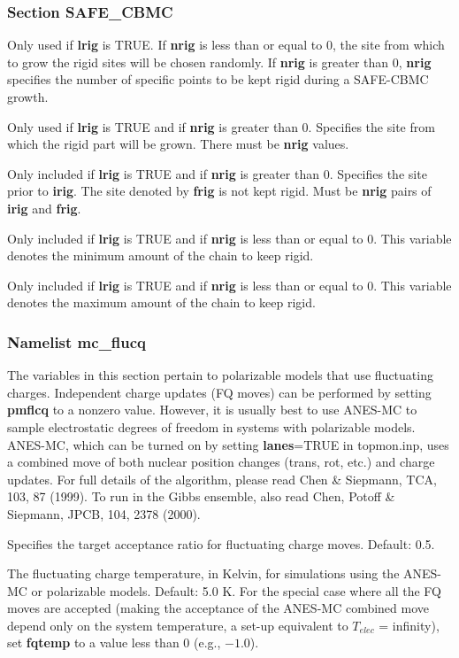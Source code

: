 \documentclass[12pt,letterpaper]{article}
\begin{document}
\subsubsection{Section \textbf{SAFE\_CBMC}}
 Only used if {\bf lrig} is TRUE. If
{\bf nrig} is less than or equal to 0, the site from which
to grow the rigid sites will be chosen randomly. If
{\bf nrig} is greater than 0, {\bf nrig} specifies the
number of specific points to be kept rigid during a
SAFE-CBMC growth.

 Only used if {\bf lrig} is TRUE and if
{\bf nrig} is greater than 0. Specifies the site from which
the rigid part will be grown. There must be \textbf{nrig}
values.

 Only included if {\bf lrig} is TRUE and
if {\bf nrig} is greater than 0. Specifies the site prior to
{\bf irig}. The site denoted by {\bf frig} is not kept
rigid. Must be {\bf nrig} pairs of {\bf irig} and {\bf
  frig}.

 Only included if {\bf lrig} is TRUE
and if {\bf nrig} is less than or equal to 0. This variable
denotes the minimum amount of the chain to keep rigid.

 Only included if {\bf lrig} is TRUE
and if {\bf nrig} is less than or equal to 0. This variable
denotes the maximum amount of the chain to keep rigid.

\subsubsection{Namelist \textbf{mc\_flucq}}

The variables in this section pertain to polarizable models that use
fluctuating charges. Independent charge updates (FQ moves) can
be performed by setting {\bf pmflcq} to a nonzero value. However, it
is usually best to use ANES-MC to sample electrostatic
degrees of freedom in systems with polarizable models.
ANES-MC, which can be turned on by setting {\bf lanes}=TRUE in topmon.inp,
uses a combined move of both nuclear position changes (trans, rot, etc.) 
and charge updates. For full details of the algorithm, please read 
Chen \& Siepmann, TCA, 103, 87 (1999). To run in the Gibbs ensemble,
also read Chen, Potoff \& Siepmann, JPCB, 104, 2378 (2000).

 Specifies the target acceptance ratio
for fluctuating charge moves. Default: 0.5.

 The fluctuating charge temperature,
in Kelvin, for simulations using the ANES-MC or polarizable
models. Default: 5.0 K. For the special case where all the FQ moves 
are accepted (making the acceptance of the ANES-MC combined
move depend only on the system temperature, a set-up
equivalent to $T_{elec}$ = infinity), set {\bf fqtemp} to a value less than 
0 (e.g., $-1.0$).
\end{document}
